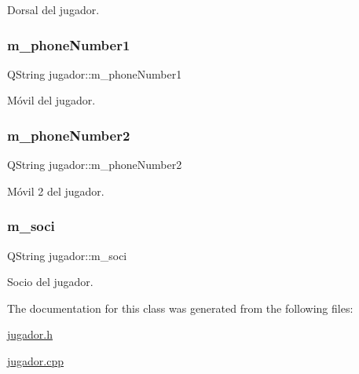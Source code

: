 Dorsal del jugador. \mbox{\label{classjugador_a1ea251ca9e7696bd7580683e5900d265}} 
\subsubsection{\texorpdfstring{m\+\_\+phone\+Number1}{m\_phoneNumber1}}
{\footnotesize\ttfamily Q\+String jugador\+::m\+\_\+phone\+Number1\hspace{0.3cm}{\ttfamily [private]}}

Móvil del jugador. \mbox{\label{classjugador_aed7290d4b5d54775a3ed94304b6f6a30}} 
\subsubsection{\texorpdfstring{m\+\_\+phone\+Number2}{m\_phoneNumber2}}
{\footnotesize\ttfamily Q\+String jugador\+::m\+\_\+phone\+Number2\hspace{0.3cm}{\ttfamily [private]}}

Móvil 2 del jugador. \mbox{\label{classjugador_af17085c4ca78df6e7820c46c902a8a44}} 
\subsubsection{\texorpdfstring{m\+\_\+soci}{m\_soci}}
{\footnotesize\ttfamily Q\+String jugador\+::m\+\_\+soci\hspace{0.3cm}{\ttfamily [private]}}

Socio del jugador. 

The documentation for this class was generated from the following files\+:\begin{DoxyCompactItemize}
\item 
\mbox{\hyperlink{jugador_8h}{jugador.\+h}}\item 
\mbox{\hyperlink{jugador_8cpp}{jugador.\+cpp}}\end{DoxyCompactItemize}
